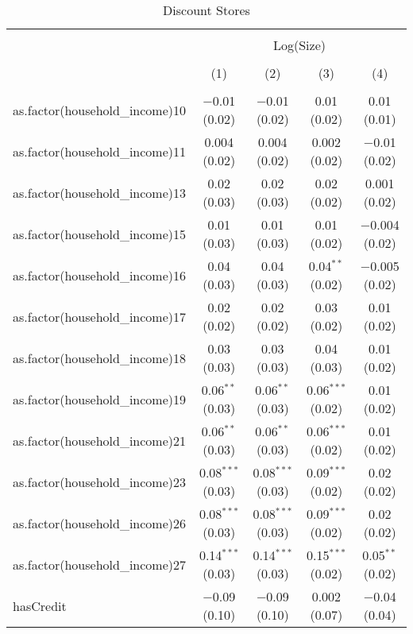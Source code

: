 
\begin{table}[!htbp] \centering 
  \caption{Discount Stores} 
  \label{tab:packageSizeDiscountLiqAppendix} 
\begin{tabular}{@{\extracolsep{5pt}}lcccc} 
\\[-1.8ex]\hline 
\hline \\[-1.8ex] 
 & \multicolumn{4}{c}{Log(Size)} \\ 
\\[-1.8ex] & (1) & (2) & (3) & (4)\\ 
\hline \\[-1.8ex] 
 as.factor(household\_income)10 & $-$0.01 (0.02) & $-$0.01 (0.02) & 0.01 (0.02) & 0.01 (0.01) \\ 
  as.factor(household\_income)11 & 0.004 (0.02) & 0.004 (0.02) & 0.002 (0.02) & $-$0.01 (0.02) \\ 
  as.factor(household\_income)13 & 0.02 (0.03) & 0.02 (0.03) & 0.02 (0.02) & 0.001 (0.02) \\ 
  as.factor(household\_income)15 & 0.01 (0.03) & 0.01 (0.03) & 0.01 (0.02) & $-$0.004 (0.02) \\ 
  as.factor(household\_income)16 & 0.04 (0.03) & 0.04 (0.03) & 0.04$^{**}$ (0.02) & $-$0.005 (0.02) \\ 
  as.factor(household\_income)17 & 0.02 (0.02) & 0.02 (0.02) & 0.03 (0.02) & 0.01 (0.02) \\ 
  as.factor(household\_income)18 & 0.03 (0.03) & 0.03 (0.03) & 0.04 (0.03) & 0.01 (0.02) \\ 
  as.factor(household\_income)19 & 0.06$^{**}$ (0.03) & 0.06$^{**}$ (0.03) & 0.06$^{***}$ (0.02) & 0.01 (0.02) \\ 
  as.factor(household\_income)21 & 0.06$^{**}$ (0.03) & 0.06$^{**}$ (0.03) & 0.06$^{***}$ (0.02) & 0.01 (0.02) \\ 
  as.factor(household\_income)23 & 0.08$^{***}$ (0.03) & 0.08$^{***}$ (0.03) & 0.09$^{***}$ (0.02) & 0.02 (0.02) \\ 
  as.factor(household\_income)26 & 0.08$^{***}$ (0.03) & 0.08$^{***}$ (0.03) & 0.09$^{***}$ (0.02) & 0.02 (0.02) \\ 
  as.factor(household\_income)27 & 0.14$^{***}$ (0.03) & 0.14$^{***}$ (0.03) & 0.15$^{***}$ (0.02) & 0.05$^{**}$ (0.02) \\ 
  hasCredit & $-$0.09 (0.10) & $-$0.09 (0.10) & 0.002 (0.07) & $-$0.04 (0.04) \\ 

\end{tabular}
\end{table}
